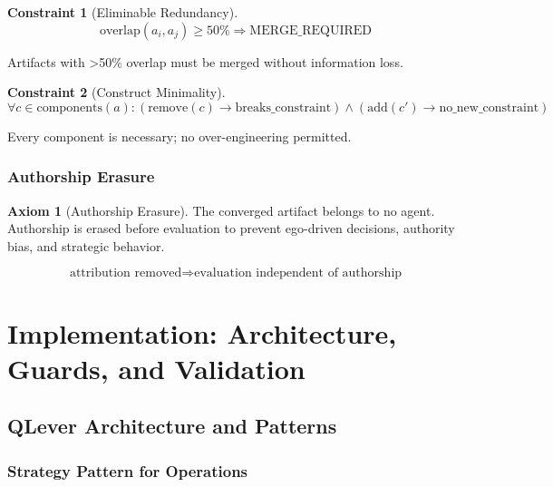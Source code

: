 \documentclass[12pt,oneside,a4paper]{book}
\theoremstyle{definition}
\newtheorem{axiom}{Axiom}[chapter]
\newtheorem{constraint}{Constraint}[chapter]
\begin{document}
\begin{constraint}[Eliminable Redundancy]
$$\text{overlap}(a_i, a_j) \geq 50\% \Rightarrow \text{MERGE\_REQUIRED}$$

Artifacts with >50\% overlap must be merged without information loss.
\end{constraint}

\begin{constraint}[Construct Minimality]
$$\forall c \in \text{components}(a): (\text{remove}(c) \to \text{breaks\_constraint}) \land (\text{add}(c') \to \text{no\_new\_constraint})$$

Every component is necessary; no over-engineering permitted.
\end{constraint}

\section{Authorship Erasure}
\label{sec:authorship-erasure}

\begin{axiom}[Authorship Erasure]
The converged artifact belongs to no agent. Authorship is erased before
evaluation to prevent ego-driven decisions, authority bias, and strategic behavior.

$$\text{attribution removed} \Rightarrow \text{evaluation independent of authorship}$$
\end{axiom}


\part{Implementation: Architecture, Guards, and Validation}
\label{part:implementation}

\chapter{QLever Architecture and Patterns}
\label{ch:qlever-architecture}


\section{Strategy Pattern for Operations}
\label{sec:strategy-operations}
\end{document}
